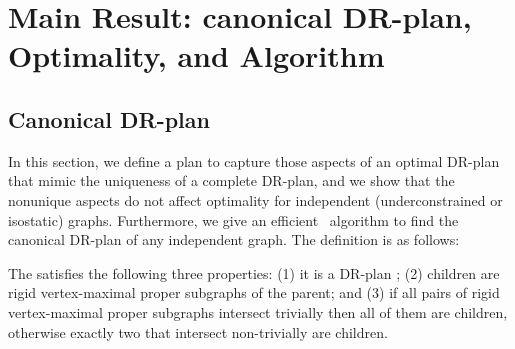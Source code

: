 \section{Main Result: canonical DR-plan, Optimality, and Algorithm}
\label{sec:DRP}



\subsection{Canonical DR-plan}
In this section, we define a  plan to capture those aspects of an optimal DR-plan that mimic the  uniqueness of a complete DR-plan, and we show that the nonunique aspects do not affect optimality for independent (underconstrained or isostatic) graphs. Furthermore, we give an efficient \candrpcomplexity\ algorithm to find the canonical DR-plan of any independent graph. The definition is as follows:

\begin{definition}\label{def:canonical_drplan}
    The   satisfies the following three properties:
    (1) it is a DR-plan ;
    (2) children are rigid vertex-maximal proper subgraphs of the parent; and
    (3) if all pairs of rigid vertex-maximal proper subgraphs intersect trivially then all of them are children, otherwise exactly two that intersect non-trivially are children.
\end{definition}

